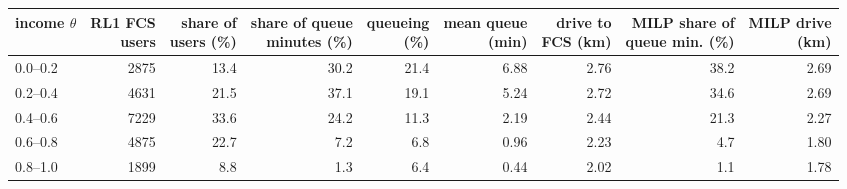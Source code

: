 \begin{tabular}{@{}lrrrrrrrr@{}}
\toprule
income $\theta$ & \shortstack[r]{RL1 FCS\\users} & \shortstack[r]{share of\\users (\%)} & \shortstack[r]{share of queue\\minutes (\%)} & \shortstack[r]{queueing\\(\%)} & \shortstack[r]{mean queue\\(min)} & \shortstack[r]{drive to\\FCS (km)} & \shortstack[r]{MILP share of\\queue min. (\%)} & \shortstack[r]{MILP drive\\(km)} \\
\midrule
0.0--0.2 & 2875 & 13.4 & 30.2 & 21.4 & 6.88 & 2.76 & 38.2 & 2.69 \\
0.2--0.4 & 4631 & 21.5 & 37.1 & 19.1 & 5.24 & 2.72 & 34.6 & 2.69 \\
0.4--0.6 & 7229 & 33.6 & 24.2 & 11.3 & 2.19 & 2.44 & 21.3 & 2.27 \\
0.6--0.8 & 4875 & 22.7 & 7.2 & 6.8 & 0.96 & 2.23 & 4.7 & 1.80 \\
0.8--1.0 & 1899 & 8.8 & 1.3 & 6.4 & 0.44 & 2.02 & 1.1 & 1.78 \\
\bottomrule
\end{tabular}
